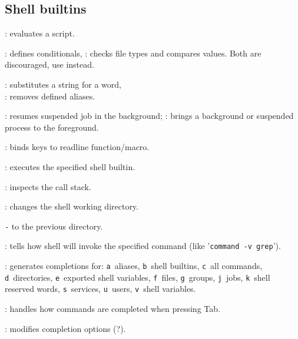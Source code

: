 %

\subsection{Shell builtins}
\begin{compactenum}
\item [\symbolbash] : evaluates a script.

\item [\symbolbash] \commandbash{[}: defines conditionals, : checks file types and compares values. Both are discouraged, use \commandbash{[[ ]]} instead.

\item [\symbolbash] : substitutes a string for a word,\\: removes defined aliases.

\item [\symbolbash] : resumes suspended job in the background; : brings a background or suspended process to the foreground.

\item [\symbolbash] : binds keys to readline function/macro.

\item [\symbolbash] : executes the specified shell builtin.

\item [\symbolbash] : inspects the call stack.

\item [\symbolbash] : changes the shell working directory.
\item [\texttt{-}] to the previous directory.

\item [\symbolbash] : tells how shell will invoke the specified command (like '{\small \texttt{command -v grep}}').

\item [\symbolbash] : generates completions for: \texttt{a}~aliases, \texttt{b}~shell builtins, \texttt{c}~all commands, \texttt{d}~directories, \texttt{e}~exported shell variables, \texttt{f}~files, \texttt{g}~groups, \texttt{j}~jobs, \texttt{k}~shell reserved words, \texttt{s}~services, \texttt{u}~users, \texttt{v}~shell variables.
\item [\symbolbash] : handles how commands are completed when pressing Tab.
\item [\symbolbash] : modifies completion options (?).


\end{compactenum}

